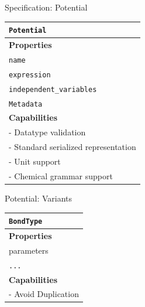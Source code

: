 \documentclass[xcolor=table]{beamer}
\begin{document}
\begin{frame}{Specification: Potential}

\begin{table}[ht]
    \centering
    \begin{tabular}{|l|}
         \hline
         \rowcolor{gray!50}
         \texttt{Potential}  \\
         \hline
         \textbf{Properties}\\
         \hline
         \texttt{name} \\
         \texttt{expression} \\
         \texttt{independent\_variables}\\
         \texttt{Metadata}\\
         \hline
         \textbf{Capabilities}\\
         \hline
         - Datatype validation \\
         - Standard serialized representation \\
         - Unit support \\
         - Chemical grammar support \\
        \hline
    \end{tabular}
    \label{tab:PotSpec}
\end{table}
\end{frame}


\begin{frame}{Potential: Variants}

\begin{table}[ht]
    \centering
    \begin{tabular}{|l|}
         \hline
         \rowcolor{gray!50}
         \texttt{BondType}  \\
         \hline
         \textbf{Properties}\\
         \hline
         parameters\\
         \texttt{...}\\
         \hline
         \textbf{Capabilities}\\
         \hline
         - Avoid Duplication \\

        \hline
    \end{tabular}
    \label{tab:PotSpec}
\end{table}
\end{frame}
\end{document}
